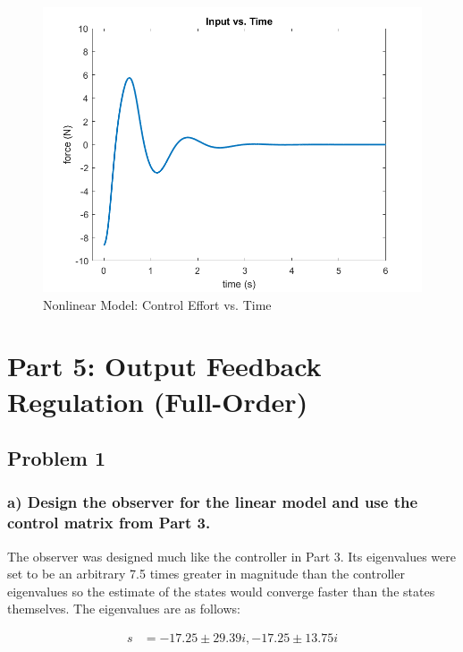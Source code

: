 \documentclass[12pt, letterpaper, onecolumn]{article}
\begin{document}
\begin{figure}[!h]
    \centering
    \includegraphics[width=\linewidth]{figs/p4-a-input.png}
    \caption{Nonlinear Model: Control Effort vs. Time}
    \label{}
\end{figure}

\clearpage

\section*{Part 5: Output Feedback Regulation (Full-Order)}

\subsection*{Problem 1}
\subsubsection*{a) Design the observer for the linear model and use the control matrix from Part 3.}
The observer was designed much like the controller in Part 3. Its eigenvalues were set to be an arbitrary 7.5 times greater in magnitude than the controller eigenvalues so the estimate of the states would converge faster than the states themselves. The eigenvalues are as follows:

\begin{equation*}
    \begin{split}
        s & = -17.25\pm 29.39i, -17.25\pm13.75i
    \end{split}
\end{equation*}
\end{document}
